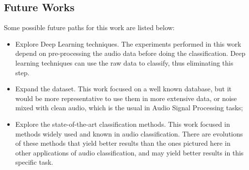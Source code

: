\documentclass[12pt]{article}
\begin{document}
\subsection{Future Works}

Some possible future paths for this work are listed below:

\begin{itemize}
	\item Explore Deep Learning techniques. The experiments performed in this work depend on pre-processing the audio data before doing the classification. Deep learning techniques can use the raw data to classify, thus eliminating this step. 
	\item Expand the dataset. This work focused on a well known database, but it would be more representative to use them in more extensive data, or noise mixed with clean audio, which is the usual in Audio Signal Processing tasks;
	\item Explore the state-of-the-art classification methods. This work focused in methods widely used and known in audio classification. There are evolutions of these methods that yield better results than the ones pictured here in other applications of audio classification, and may yield better results in this specific task.
\end{itemize}







\end{document}
